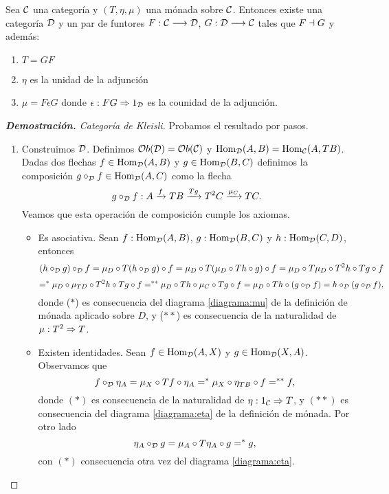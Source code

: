 \begin{theorem}
  Sea $\mathcal{C}$ una categoría y $(T, \eta, \mu)$ una mónada
  sobre $\mathcal{C}$. Entonces existe una categoría $\mathcal{D}$ y un par
  de funtores $F : \mathcal{C}\longrightarrow \mathcal{D}$, $G : \mathcal{D}\longrightarrow \mathcal{C}$ tales
  que $F \dashv G$ y además:
  \begin{enumerate}
  \item $T = GF$
  \item $\eta$ es la unidad de la adjunción
  \item $\mu = F\epsilon G$ donde $\epsilon: FG\Rightarrow 1_{\mathcal{D}}$ es
    la counidad de la adjunción.
  \end{enumerate}
\end{theorem}
\begin{proof}[\textbf{Demostración. } Categoría de Kleisli]
  Probamos el resultado por pasos.
  \begin{enumerate}
  \item Construimos $\mathcal{D}$. Definimos $\mathcal{O}b(\mathcal{D}) = \mathcal{O}b(\mathcal{C})$ y
    $\operatorname{Hom}_{\mathcal{D}}(A, B) = \operatorname{Hom}_{\mathcal{C}}(A, TB)$.
    Dadas dos flechas $f \in \operatorname{Hom}_{\mathcal{D}}(A, B)$ y
    $g \in \operatorname{Hom}_{\mathcal{D}}(B, C)$ definimos la composición $g \circ_{\mathcal{D}} f \in \operatorname{Hom}_{\mathcal{D}}(A, C)$
    como la flecha
    $$g \circ_{\mathcal{D}} f :
    A \xrightarrow{f} TB \xrightarrow{Tg} T^2 C \xrightarrow{\mu_C} T C
    .$$
    Veamos que esta operación de composición
    cumple los axiomas.
    \begin{itemize}
    \item Es asociativa. Sean $f : \operatorname{Hom}_{\mathcal{D}}(A, B)$, $g : \operatorname{Hom}_{\mathcal{D}}(B, C)$
      y $h : \operatorname{Hom}_{\mathcal{D}}(C, D)$, entonces
      $$(h \circ_{\mathcal{D}} g) \circ_{\mathcal{D}} f = \mu_D \circ T(h \circ_{\mathcal{D}} g) \circ f
      = \mu_D \circ T(\mu_D \circ Th \circ g) \circ f
      = \mu_D \circ T\mu_D \circ T^2h \circ Tg \circ f$$
      $$=^* \mu_D \circ \mu_{TD} \circ T^2h \circ Tg \circ f
      =^{**}\mu_D \circ Th \circ \mu_C \circ Tg \circ f
      =\mu_D \circ Th \circ (g \circ_{\mathcal{D}} f)
      = h \circ_{\mathcal{D}} (g \circ_{\mathcal{D}} f),$$
      donde ($*$) es consecuencia del diagrama \eqref{diagrama:mu}
      de la definición de mónada aplicado sobre $D$, y ($**$) es
      consecuencia de la naturalidad de $\mu : T^2\Rightarrow T$.

    \item Existen identidades. Sean
      $f \in \operatorname{Hom}_{\mathcal{D}}(A, X)$ y $g \in \operatorname{Hom}_{\mathcal{D}}(X, A)$. Observamos
      que
      $$f \circ_{\mathcal{D}} \eta_A = \mu_X \circ Tf \circ \eta_A
      =^* \mu_X \circ \eta_{TB} \circ f
      =^{**} f,$$
    donde $(*)$ es consecuencia de la naturalidad de
    $\eta : 1_{\mathcal{C}}\Rightarrow T$, y $(**)$ es consecuencia
    del diagrama \eqref{diagrama:eta} de la definición de mónada.
    Por otro lado
    $$\eta_A \circ_{\mathcal{D}} g = \mu_A \circ T\eta_A \circ g
    =^* g,$$
    con $(*)$ consecuencia otra vez del diagrama \eqref{diagrama:eta}.


\end{itemize}
\end{enumerate}
\end{proof}

